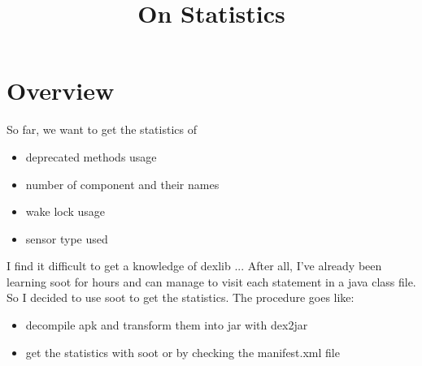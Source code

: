 \documentclass{article}
\title{On Statistics}
\begin{document}
\tableofcontents
\section{Overview}
So far, we want to get the statistics of
\begin{itemize}
	\item deprecated methods usage
	\item number of component and their names
	\item wake lock usage
	\item sensor type used
\end{itemize}
\par
{
I find it difficult to get a knowledge of dexlib ... 
After all, I've already been learning soot for hours and can manage 
to visit each statement in a java class file. 
So I decided to use soot to get the statistics. 
The procedure goes like:
\begin{itemize}
	\item decompile apk and transform them into jar with dex2jar
	\item get the statistics with soot or by checking the manifest.xml file
\end{itemize}
}
\end{document}
